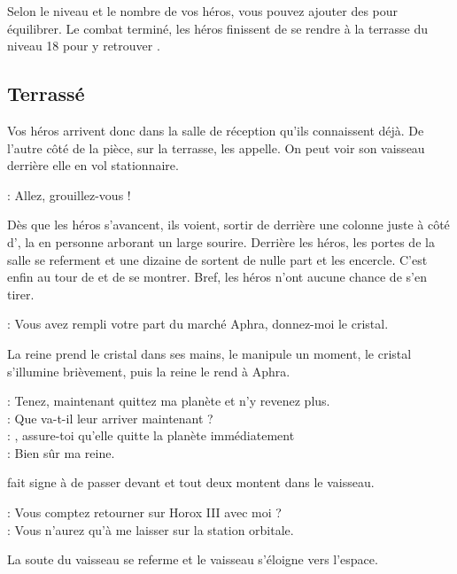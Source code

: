 Selon le niveau et le nombre de vos héros, vous pouvez ajouter des  pour équilibrer.
\bigbreak
Le combat terminé, les héros finissent de se rendre à la terrasse du niveau 18 pour y retrouver .
\newpage

\subsection{Terrassé}

Vos héros arrivent donc dans la salle de réception qu’ils connaissent déjà. De l’autre côté de la pièce, sur la terrasse,  les appelle. On peut voir son vaisseau derrière elle en vol stationnaire.

\begin{quotebox}
\noindent\textbf{}: Allez, grouillez-vous !
\end{quotebox}

Dès que les héros s’avancent, ils voient, sortir de derrière une colonne juste à côté d’, la  en personne arborant un large sourire. Derrière les héros, les portes de la salle se referment et une dizaine de  sortent de nulle part et les encercle. C’est enfin au tour de  et  de se montrer. Bref, les héros n’ont aucune chance de s’en tirer.

\begin{quotebox}
\noindent\textbf{}: Vous avez rempli votre part du marché Aphra, donnez-moi le cristal.
\end{quotebox}
La reine prend le cristal dans ses mains, le manipule un moment, le cristal s’illumine brièvement, puis la reine le rend à Aphra.
\begin{quotebox}
\noindent\textbf{}: Tenez, maintenant quittez ma planète et n’y revenez plus.\\
\noindent\textbf{}: Que va-t-il leur arriver maintenant ?\\
\noindent\textbf{}: , assure-toi qu’elle quitte la planète immédiatement\\
\noindent\textbf{}: Bien sûr ma reine.
\end{quotebox}
 fait signe à  de passer devant et tout deux montent dans le vaisseau.
\begin{quotebox}
\noindent\textbf{}: Vous comptez retourner sur Horox III avec moi ?\\
\noindent\textbf{}: Vous n’aurez qu’à me laisser sur la station orbitale.
\end{quotebox}
La soute du vaisseau se referme et le vaisseau s’éloigne vers l’espace.

